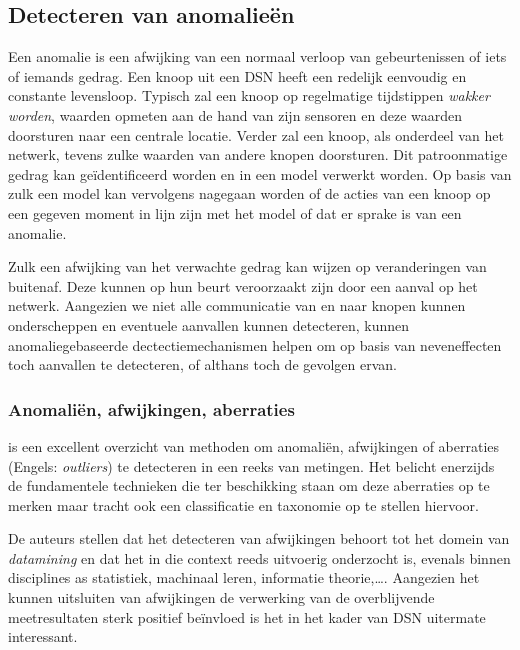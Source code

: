 
\subsection{Detecteren van anomalie\"en}
\label{subsection:anomaly}

Een anomalie is een afwijking van een normaal verloop van gebeurtenissen of
iets of iemands gedrag. Een knoop uit een DSN heeft een redelijk eenvoudig en
constante levensloop. Typisch zal een knoop op regelmatige tijdstippen
\emph{wakker worden}, waarden opmeten aan de hand van zijn sensoren en deze
waarden doorsturen naar een centrale locatie. Verder zal een knoop, als
onderdeel van het netwerk, tevens zulke waarden van andere knopen doorsturen.
Dit patroonmatige gedrag kan ge\"identificeerd worden en in een model verwerkt
worden. Op basis van zulk een model kan vervolgens nagegaan worden of de acties
van een knoop op een gegeven moment in lijn zijn met het model of dat er sprake
is van een anomalie.

Zulk een afwijking van het verwachte gedrag kan wijzen op veranderingen van
buitenaf. Deze kunnen op hun beurt veroorzaakt zijn door een aanval op het
netwerk. Aangezien we niet alle communicatie van en naar knopen kunnen
onderscheppen en eventuele aanvallen kunnen detecteren, kunnen
anomaliegebaseerde dectectiemechanismen helpen om op basis van neveneffecten
toch aanvallen te detecteren, of althans toch de gevolgen ervan.

\subsubsection*{Anomali\"en, afwijkingen, aberraties}
\label{subsubsection:outlier}

\citep{zhang2010outlier} is een excellent overzicht van methoden om anomali\"en,
afwijkingen of aberraties (Engels: \emph{outliers}) te detecteren in een reeks
van metingen. Het belicht enerzijds de fundamentele technieken die ter
beschikking staan om deze aberraties op te merken maar tracht ook een
classificatie en taxonomie op te stellen hiervoor.

De auteurs stellen dat het detecteren van afwijkingen behoort tot het domein
van \emph{datamining} en dat het in die context reeds uitvoerig onderzocht is,
evenals binnen disciplines as statistiek, machinaal leren, informatie
theorie,\dots. Aangezien het kunnen uitsluiten van afwijkingen de verwerking
van de overblijvende meetresultaten sterk positief be\"invloed is het in het
kader van DSN uitermate interessant.

